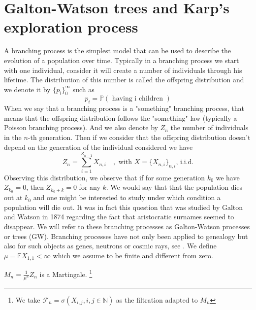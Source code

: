 \section{Galton-Watson trees and Karp's exploration process}
A branching process is the simplest model that can be used to describe the evolution of a population over time.
Typically in a branching process we start with one individual, consider it will create a number of individuals through his lifetime. 
The distribution of this number is called the offspring distribution and we denote it by $\{p_i\}_0^{\infty}$ such as
\begin{equation}
	p_i = \mathbb{P}(\text{ having i children })
\end{equation}
When we say that a branching process is a "something" branching process, that means that the offspring distribution follows the "something" law (typically a Poisson branching process).
And we also denote by $Z_n$ the number of individuals in the $n$-th generation. 
Then if we consider that the offspring distribution doesn't depend on the generation of the individual considered we have
\begin{equation}
	Z_n = \sum_{i=1}^{Z_{n-1}}X_{n, i} \quad, \text{ with } X = \{X_{n,i}\}_{n,i} \text{,  i.i.d.}
\end{equation}
Observing this distribution, we observe that if for some generation $k_0$ we have $Z_{k_0} = 0$, then $Z_{k_0 + k} = 0$ for any $k$. We would say that that the population dies out at $k_0$ and one might be interested to study under which condition a population will die out.
It was in fact this question that was studied by Galton and Watson in 1874 regarding the fact that aristocratic surnames seemed to disappear.
We will refer to these branching processes as Galton-Watson processes or trees (GW).
Branching processes have not only been applied to genealogy but also for such objects as genes, neutrons or cosmic rays, see \cite{Harris64}.
\newline
We define $\mu = \mathbb{E} X_{1,1} < \infty$ which we assume to be finite and different from zero.
\begin{lemma}\label{martinGW}
	$M_n = \frac{1}{\mu^n}Z_n$ is a Martingale. 
	\footnote{We take $\mathcal{F}_n = \sigma(X_{i,j} , i,j \in \mathbb{N})$ as the filtration adapted to $M_n$ }
\end{lemma}
